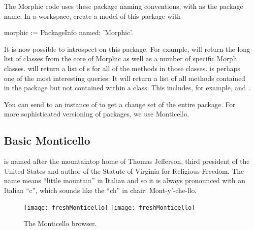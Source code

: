 \documentclass[a4paper,10pt,twoside]{book}
\begin{document}

The Morphic code uses these package naming conventions, with  as the package name.
In a workspace, create a model of this package with

\begin{code}{}
morphic := PackageInfo named: 'Morphic'.
\end{code}

It is now possible to introspect on this package.
For example,  will return the long list of classes from the core of Morphic as well as a number of specific Morph classes.
 will return a list of s for all of the methods in those classes.
 is perhaps one of the most interesting queries:
It will return a list of all methods contained in the  package but not contained within a  class.
This includes, for example,  and .


You can send  to an instance of  to get a change set of the entire package.
For more sophisticated versioning of packages, we use Monticello.

\subsection{Basic Monticello}

 is named after the mountaintop home of Thomas Jefferson, third president of the United States and author of the Statute of Virginia for Religious Freedom.
The name means ``little mountain'' in Italian and so it is always pronounced with an Italian ``c'', which sounds like the ``ch'' in chair: Mont-y'-che-llo.


\begin{figure}[btp]
	\begin{center}
	\ifluluelse
		{\texttt{[image: freshMonticello]}}
		{\texttt{[image: freshMonticello]}}
	\end{center}
	\caption{The Monticello browser.}
	\label{fig:freshMonticello}
\end{figure}
\end{document}

